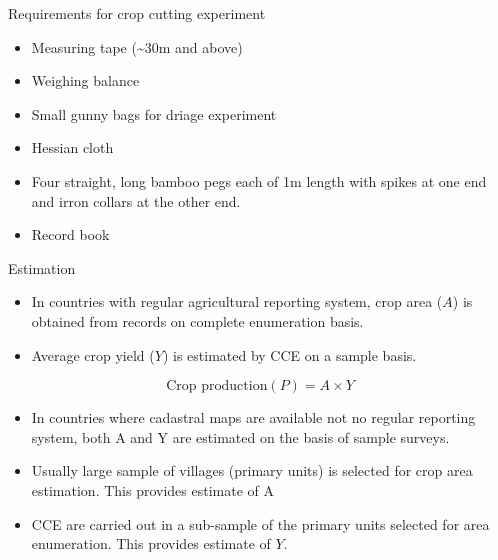 \documentclass[11pt,dvipsnames,ignorenonframetext,aspectratio=169]{beamer}
\providecommand{\tightlist}{%
  \setlength{\itemsep}{0pt}\setlength{\parskip}{0pt}}
\begin{document}
\begin{frame}{Requirements for crop cutting experiment}
\protect\hypertarget{requirements-for-crop-cutting-experiment}{}
\begin{itemize}
\tightlist
\item
  Measuring tape (\textasciitilde30m and above)
\item
  Weighing balance
\item
  Small gunny bags for driage experiment
\item
  Hessian cloth
\item
  Four straight, long bamboo pegs each of 1m length with spikes at one
  end and irron collars at the other end.
\item
  Record book
\end{itemize}
\end{frame}

\begin{frame}{Estimation}
\protect\hypertarget{estimation}{}
\begin{itemize}
\tightlist
\item
  In countries with regular agricultural reporting system, crop area
  (\(A\)) is obtained from records on complete enumeration basis.
\item
  Average crop yield (\(Y\)) is estimated by CCE on a sample basis.
\end{itemize}

\[
\text{Crop production} (P) = A \times Y
\]

\begin{itemize}
\tightlist
\item
  In countries where cadastral maps are available not no regular
  reporting system, both A and Y are estimated on the basis of sample
  surveys.
\item
  Usually large sample of villages (primary units) is selected for crop
  area estimation. This provides estimate of A
\item
  CCE are carried out in a sub-sample of the primary units selected for
  area enumeration. This provides estimate of \(Y\).
\end{itemize}
\end{frame}
\end{document}
